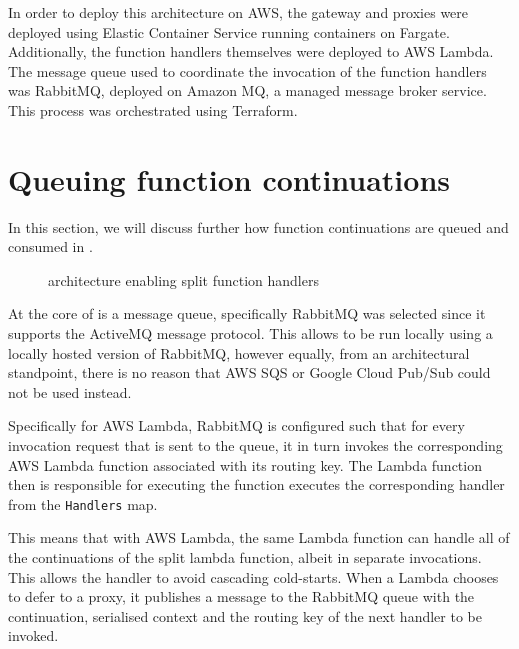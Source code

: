 In order to deploy this architecture on AWS, the gateway and proxies were deployed using Elastic Container Service running containers on Fargate. Additionally, the function handlers themselves were deployed to AWS Lambda. The message queue used to coordinate the invocation of the function handlers was RabbitMQ, deployed on Amazon MQ, a managed message broker service. This process was orchestrated using Terraform.

\section{Queuing function continuations}
In this section, we will discuss further how function continuations are queued and consumed in \faaas{}.

\begin{figure}
    \centering
    \quad
    \caption{\faas{} architecture enabling split function handlers}
\end{figure}

At the core of \faaas{} is a message queue, specifically RabbitMQ was selected since it supports the ActiveMQ message protocol. This allows \faaas{} to be run locally using a locally hosted version of RabbitMQ, however equally, from an architectural standpoint, there is no reason that AWS SQS or Google Cloud Pub/Sub could not be used instead.

Specifically for AWS Lambda, RabbitMQ is configured such that for every invocation request that is sent to the queue, it in turn invokes the corresponding AWS Lambda function associated with its routing key. The Lambda function then is responsible for executing the function executes the corresponding handler from the \verb|Handlers| map.

This means that with AWS Lambda, the same Lambda function can handle all of the continuations of the split lambda function, albeit in separate invocations. This allows the handler to avoid cascading cold-starts. When a Lambda chooses to defer to a proxy, it publishes a message to the RabbitMQ queue with the continuation, serialised context and the routing key of the next handler to be invoked.

